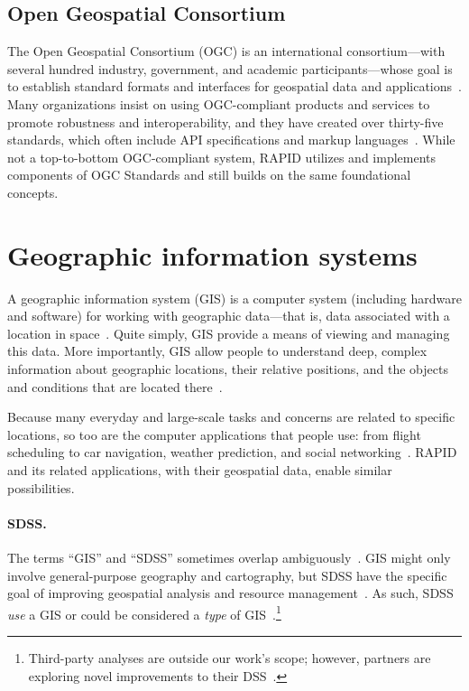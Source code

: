 \subsection{Open Geospatial Consortium}
The Open Geospatial Consortium (OGC) is an international consortium---with several hundred industry, government, and academic participants---whose goal is to establish standard formats and interfaces for geospatial data and applications~\cite{ogc}. Many organizations insist on using OGC-compliant products and services to promote robustness and interoperability, and they have created over thirty-five standards, which often include API specifications and markup languages~\cite{ogc,Dunning2013}. While not a top-to-bottom OGC-compliant system, RAPID utilizes and implements components of OGC Standards and still builds on the same foundational concepts.

\section{Geographic information systems}
\label{gis}
A geographic information system (GIS) is a computer system (including hardware and software) for working with geographic data---that is, data associated with a location in space~\cite{Esriintro,gentle_intro}. Quite simply, GIS provide a means of viewing and managing this data. More importantly, GIS allow people to understand deep, complex information about geographic locations, their relative positions, and the objects and conditions that are located there~\cite{Esriintro,gentle_intro}.

Because many everyday and large-scale tasks and concerns are related to specific locations, so too are the computer applications that people use: from flight scheduling to car navigation, weather prediction, and social networking~\cite{Esriintro}. RAPID and its related applications, with their geospatial data, enable similar possibilities.

\paragraph{SDSS.}
The terms ``GIS'' and ``SDSS'' sometimes overlap ambiguously~\cite{Peterson}. GIS might only involve general-purpose geography and cartography, but SDSS have the specific goal of improving geospatial analysis and resource management~\cite{Peterson}. As such, SDSS \textit{use} a GIS or could be considered a \textit{type} of GIS~\cite{Peterson}.\footnote{Third-party analyses are outside our work's scope; however, partners are exploring novel improvements to their DSS~\cite{Dunning2013}.}


